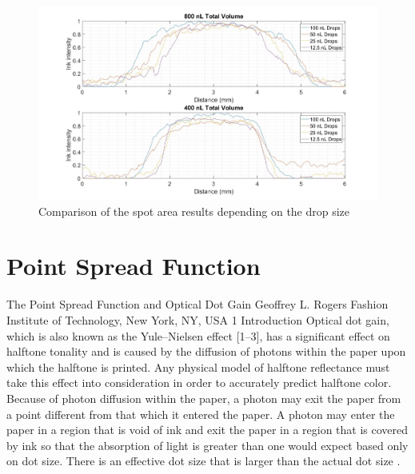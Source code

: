 \begin{figure}[h]
	\centering
	\includegraphics[width=1\textwidth]{grafiken/SpotArea.jpg}
	\caption{Comparison of the spot area results depending on the drop size}
	\label{fig:SpotArea}
\end{figure} 

\section{Point Spread Function}
The Point Spread Function and
Optical Dot Gain
Geoffrey L. Rogers
Fashion Institute of Technology, New York, NY, USA
1  Introduction
Optical dot gain, which is also known as the Yule–Nielsen effect [1–3], has a significant
effect on halftone tonality and is caused by the diffusion of photons within the paper upon
which the halftone is printed. Any physical model of halftone reflectance must take this effect
into consideration in order to accurately predict halftone color.
Because of photon diffusion within the paper, a photon may exit the paper from a point
different from that which it entered the paper. A photon may enter the paper in a region that is
void of ink and exit the paper in a region that is covered by ink so that the absorption of light
is greater than one would expect based only on dot size. There is an effective dot size that is
larger than the actual dot size \citep{rogers2015point}.




